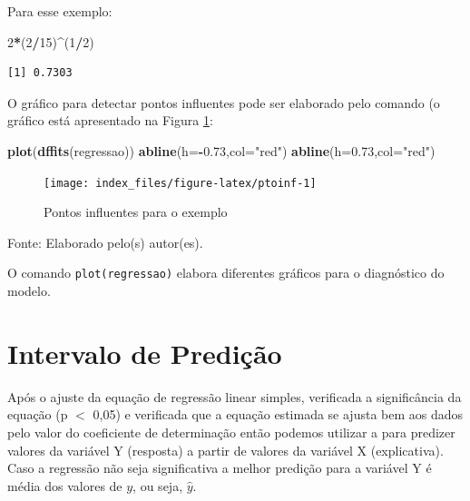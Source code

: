 \documentclass[12pt,portuguese,oneside]{book}
\newenvironment{Shaded}{\begin{snugshade}}{\end{snugshade}}
\newcommand{\KeywordTok}[1]{\textcolor[rgb]{0.13,0.29,0.53}{\textbf{#1}}}
\newcommand{\DataTypeTok}[1]{\textcolor[rgb]{0.13,0.29,0.53}{#1}}
\newcommand{\DecValTok}[1]{\textcolor[rgb]{0.00,0.00,0.81}{#1}}
\newcommand{\FloatTok}[1]{\textcolor[rgb]{0.00,0.00,0.81}{#1}}
\newcommand{\StringTok}[1]{\textcolor[rgb]{0.31,0.60,0.02}{#1}}
\newcommand{\OperatorTok}[1]{\textcolor[rgb]{0.81,0.36,0.00}{\textbf{#1}}}
\newcommand{\NormalTok}[1]{#1}
\begin{document}
Para esse exemplo:

\begin{Shaded}
\begin{Highlighting}[]
\DecValTok{2}\OperatorTok{*}\NormalTok{(}\DecValTok{2}\OperatorTok{/}\DecValTok{15}\NormalTok{)}\OperatorTok{^}\NormalTok{(}\DecValTok{1}\OperatorTok{/}\DecValTok{2}\NormalTok{)}
\end{Highlighting}
\end{Shaded}

\begin{verbatim}
[1] 0.7303
\end{verbatim}

O gráfico para detectar pontos influentes pode ser elaborado pelo
comando (o gráfico está apresentado na Figura \ref{fig:ptoinf}:

\begin{Shaded}
\begin{Highlighting}[]
\KeywordTok{plot}\NormalTok{(}\KeywordTok{dffits}\NormalTok{(regressao))}
\KeywordTok{abline}\NormalTok{(}\DataTypeTok{h=}\OperatorTok{-}\FloatTok{0.73}\NormalTok{,}\DataTypeTok{col=}\StringTok{"red"}\NormalTok{)}
\KeywordTok{abline}\NormalTok{(}\DataTypeTok{h=}\FloatTok{0.73}\NormalTok{,}\DataTypeTok{col=}\StringTok{"red"}\NormalTok{)}
\end{Highlighting}
\end{Shaded}

\begin{figure}[H]

{\centering \texttt{[image: index\_files/figure-latex/ptoinf-1]} 

}

\caption{Pontos influentes para o exemplo}\label{fig:ptoinf}
\end{figure}

Fonte: Elaborado pelo(s) autor(es).

O comando \texttt{plot(regressao)} elabora diferentes gráficos para o
diagnóstico do modelo.

\section{Intervalo de Predição}\label{intervalo-de-predicao}

Após o ajuste da equação de regressão linear simples, verificada a
significância da equação (p \(<\) 0,05) e verificada que a equação
estimada se ajusta bem aos dados pelo valor do coeficiente de
determinação então podemos utilizar a para predizer valores da variável
Y (resposta) a partir de valores da variável X (explicativa). Caso a
regressão não seja significativa a melhor predição para a variável Y é
média dos valores de \(y\), ou seja, \(\hat{y}\).
\end{document}
